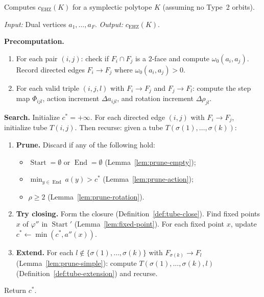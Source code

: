 \begin{unverified}
\begin{algorithm}\label{alg:tube}
Computes $c_{\mathrm{EHZ}}(K)$ for a symplectic polytope $K$
(assuming no Type~2 orbits).

\smallskip\noindent
\emph{Input:} Dual vertices $a_1, \ldots, a_F$.
\quad
\emph{Output:} $c_{\mathrm{EHZ}}(K)$.

\smallskip\noindent
\textbf{Precomputation.}
\begin{enumerate}
\item For each pair $(i,j)$: check if $F_i \cap F_j$ is a $2$-face
  and compute $\omega_0(a_i, a_j)$. Record directed edges $F_i \to F_j$
  where $\omega_0(a_i, a_j) > 0$.
\item For each valid triple $(i,j,l)$ with $F_i \to F_j$ and $F_j \to F_l$:
  compute the step map $\Phi_{ijl}$,
  action increment $\Delta a_{ijl}$,
  and rotation increment $\Delta\rho_{jl}$.
\end{enumerate}

\smallskip\noindent
\textbf{Search.}
Initialize $c^* = +\infty$.
For each directed edge $(i, j)$ with $F_i \to F_j$,
initialize tube $T(i, j)$.
Then recurse: given a tube $T(\sigma(1), \ldots, \sigma(k))$:

\begin{enumerate}
\item \textbf{Prune.} Discard if any of the following hold:
  \begin{itemize}
    \item $\operatorname{Start} = \emptyset$ or $\operatorname{End} = \emptyset$
      (Lemma~\ref{lem:prune-empty});
    \item $\min_{y \in \operatorname{End}} a(y) > c^*$
      (Lemma~\ref{lem:prune-action});
    \item $\rho \geq 2$ (Lemma~\ref{lem:prune-rotation}).
  \end{itemize}

\item \textbf{Try closing.}
  Form the closure
  (Definition~\ref{def:tube-close}).
  Find fixed points $x$ of $\varphi''$ in $\operatorname{Start}'$
  (Lemma~\ref{lem:fixed-point}).
  For each fixed point $x$, update $c^* \leftarrow \min(c^*, a''(x))$.

\item \textbf{Extend.}
  For each $l \notin \{\sigma(1), \ldots, \sigma(k)\}$
  with $F_{\sigma(k)} \to F_l$
  (Lemma~\ref{lem:prune-simple}):
  compute $T(\sigma(1), \ldots, \sigma(k), l)$
  (Definition~\ref{def:tube-extension}) and recurse.
\end{enumerate}

\noindent
Return $c^*$.
\end{algorithm}
\end{unverified}


